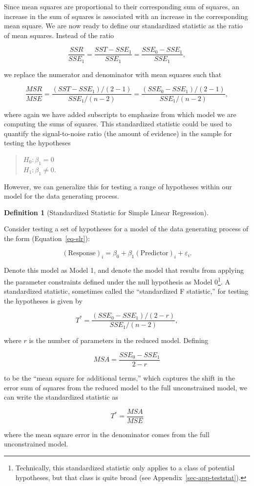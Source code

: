 \documentclass[
  letterpaper,
  DIV=11,
  numbers=noendperiod]{scrreprt}
\theoremstyle{plain}
\theoremstyle{definition}
\theoremstyle{definition}
\newtheorem{definition}{Definition}[chapter]
\theoremstyle{remark}
\begin{document}
Since mean squares are proportional to their corresponding sum of
squares, an increase in the sum of squares is associated with an
increase in the corresponding mean square. We are now ready to define
our standardized statistic as the ratio of mean squares. Instead of the
ratio

\[\frac{SSR}{SSE_1} = \frac{SST - SSE_1}{SSE_1} = \frac{SSE_0 - SSE_1}{SSE_1},\]

we replace the numerator and denominator with mean squares such that

\[\frac{MSR}{MSE} = \frac{\left(SST - SSE_1\right)/(2 - 1)}{SSE_1/(n - 2)} = \frac{\left(SSE_0 - SSE_1\right)/(2 - 1)}{SSE_1/(n - 2)},\]

where again we have added subscripts to emphasize from which model we
are computing the sums of squares. This standardized statistic could be
used to quantify the signal-to-noise ratio (the amount of evidence) in
the sample for testing the hypotheses

\begin{quote}
\(H_0: \beta_1 = 0\)\\
\(H_1: \beta_1 \neq 0.\)
\end{quote}

However, we can generalize this for testing a range of hypotheses within
our model for the data generating process.

\begin{definition}[Standardized Statistic for Simple Linear
Regression]\protect\hypertarget{def-standard-f}{}\label{def-standard-f}

Consider testing a set of hypotheses for a model of the data generating
process of the form (Equation~\ref{eq-slr}):

\[(\text{Response})_i = \beta_0 + \beta_1(\text{Predictor})_i + \varepsilon_i.\]

Denote this model as Model 1, and denote the model that results from
applying the parameter constraints defined under the null hypothesis as
Model 0\footnote{Technically, this standardized statistic only applies
  to a class of potential hypotheses, but that class is quite broad (see
  Appendix~\ref{sec-app-teststat}).}. A standardized statistic,
sometimes called the ``standardized F statistic,'' for testing the
hypotheses is given by

\[T^* = \frac{\left(SSE_0 - SSE_1\right) / (2 - r)}{SSE_1 / (n - 2)},\]

where \(r\) is the number of parameters in the reduced model. Defining

\[MSA = \frac{SSE_0 - SSE_1}{2 - r}\]

to be the ``mean square for additional terms,'' which captures the shift
in the error sum of squares from the reduced model to the full
unconstrained model, we can write the standardized statistic as

\[T^* = \frac{MSA}{MSE}\]

where the mean square error in the denominator comes from the full
unconstrained model.

\end{definition}
\end{document}
